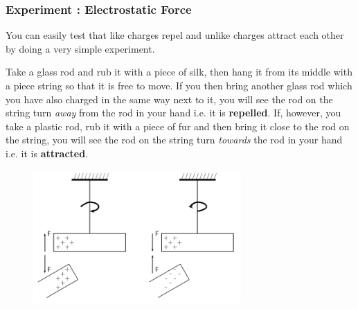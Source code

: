     \addtocounter{footnote}{-0}
    
      \par 
\label{m38780*secfhsst!!!underscore!!!id162}
            \subsubsection{  Experiment : Electrostatic Force }
            \nopagebreak
            
      \label{m38780*id200937}You can easily test that
like charges repel and unlike charges attract each other by doing a very
simple experiment.\par 
      \label{m38780*id200944}Take a glass rod and rub it with a piece of silk, then hang it from its middle with a piece string so that it is free to move. If you then bring another glass rod which you
have also charged in the same way next to it, you will see the rod
on the string turn \textsl{away} from the rod in your hand i.e. it
is \textbf{repelled}. If, however, you take a plastic rod, rub it
with a piece of fur and then bring it close to the rod on the
string, you will see the rod on the string turn \textsl{towards} the
rod in your hand i.e. it is \textbf{attracted}.\par 
      \label{m38780*id200971}
        
    \setcounter{subfigure}{0}


	\begin{figure}[H] %
    \begin{center}
    \label{m38780*id200974!!!underscore!!!media}\label{m38780*id200974!!!underscore!!!printimage}\includegraphics[width=300px]{col11305.imgs/m38780_PG10C8_006.png} %
        
      \vspace{2pt}
    \vspace{.1in}
    
    \end{center}

 \end{figure}   

